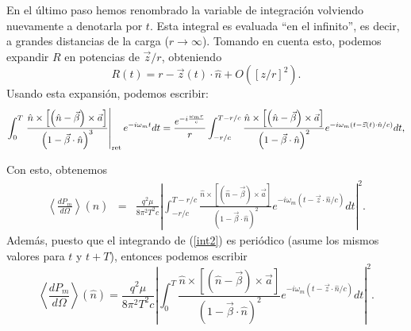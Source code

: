 En el último paso hemos renombrado la variable de integración volviendo
nuevamente a denotarla por $t$. Esta integral es evaluada ``en el infinito'', es decir, a grandes distancias de la carga ($r\rightarrow\infty$). Tomando en cuenta esto, podemos expandir $R$ en potencias de ${\vec{z}}/{r}$, obteniendo
\begin{equation}
R(t)  =r-\vec{z}(t) \cdot\hat{n}+O\left(\left[z/r\right]^2\right). \label{expR} %
\end{equation}
Usando esta expansión, podemos escribir:
\begin{equation}
\int_0^{T}\left.\frac{\hat{n}\times\left[\left(\hat{n}-\vec{\beta}\right)\times\vec{a}\right] }{\left(1-\vec{\beta}\cdot\hat{n}\right)^3}\right|_{\rm ret} e^{-i\omega_{m}t}dt =\frac{e^{-i\frac{\omega_m r}{c}}}{r}\int_{-r/c}^{T-r/c}\frac{\hat{n}\times\left[ \left( \hat{n}-\vec{\beta}\right)\times{\vec{a}}\right] }{\left( 1-\vec{\beta}\cdot\hat{n}\right)^2}
e^{-i\omega_m(t-\vec{z}(t)\cdot\hat{n}/c)} dt,
\end{equation}

Con esto, obtenemos
\begin{eqnarray}
\left\langle \frac{dP_{m}}{d\Omega}\right\rangle (\hat{n})
  &=&\frac{q^2\mu}{8\pi^2T^2c}\left|
\int_{-{r}/{c}}^{T-{r}/{c}}\frac{\hat{n}\times\left[\left(\hat{n}-\vec{
\beta}\right)\times\vec{a}\right]}{\left(1-\vec{\beta}\cdot\hat{n}\right)^2} e^{-i\omega_{m}\left(t-\vec{z}\cdot\hat{n}/c\right)}dt \right|^2. \label{int2}
\end{eqnarray}
Además, puesto que el integrando de (\ref{int2}) es periódico (asume los
mismos valores para $t$ y $t+T$), entonces podemos escribir
\begin{equation}
\boxed{\left\langle \frac{dP_{m}}{d\Omega}\right\rangle (\hat{n})
=\frac{q^2\mu}{8\pi^2T^2c}\left|
\int_0^{T}\frac{\hat{n}\times\left[\left(\hat{n}-\vec{\beta}\right)
\times\vec{a}\right]}{\left(1-\vec{\beta}\cdot\hat{n}\right)^2} e^{-i\omega_{m}\left(t-\vec{z}\cdot\hat{n}/c\right)}dt \right|^2.}\label{int3}
\end{equation}

